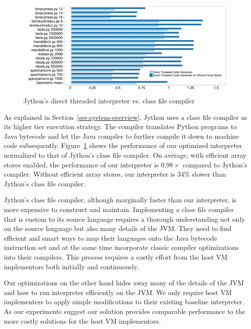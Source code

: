 \begin{figure}[t]
\centering
\includegraphics[scale=.44]{figures/ch2-benchmark-jython-direct-threading-compiler.pdf}
\caption{Jython's direct threaded interpreter vs. class file compiler}
\label{fig:benchmark-jython-direct-threading-compiler}
\end{figure}

As explained in Section~\ref{sec:system-overview}, Jython uses a class file compiler as its higher tier execution strategy.
The compiler translates Python programs to Java bytecode and let the Java compiler to further compile it down to machine code subsequently.
Figure~\ref{fig:benchmark-jython-direct-threading-compiler} shows the performance of our optimized interpreter normalized to that of Jython's class file compiler.
On average, with efficient array stores enabled, the performance of our interpreter is $0.98\times$ compared to Jython's compiler.
Without efficient array stores, our interpreter is $34\%$ slower than Jython's class file compiler.

Jython's class file compiler, although marginally faster than our interpreter, is more expensive to construct and maintain.
Implementing a class file compiler that is custom to its source language requires a thorough understanding not only on the source language but also many details of the JVM.
They need to find efficient and smart ways to map their languages onto the Java bytecode instruction set and at the same time incorporate classic compiler optimizations into their compilers.
This process requires a costly effort from the host VM implementors both initially and continuously.

Our optimizations on the other hand hides away many of the details of the JVM and how to run interpreter efficiently on the JVM.
We only require host VM implementers to apply simple modifications to their existing baseline interpreter.
As our experiments suggest our solution provides comparable performance to the more costly solutions for the host VM implementors.

